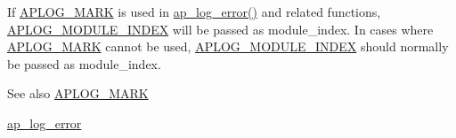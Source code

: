 If \hyperlink{group__APACHE__CORE__LOG_ga655e126996849bcb82e4e5a14c616f4a}{A\+P\+L\+O\+G\+\_\+\+M\+A\+RK} is used in \hyperlink{group__APACHE__CORE__LOG_ga5e6676c87418af7a1d323a116c78ecb4}{ap\+\_\+log\+\_\+error()} and related functions, \hyperlink{group__APACHE__CORE__LOG_gae75325996d1b2cf6120dded4cb153a22}{A\+P\+L\+O\+G\+\_\+\+M\+O\+D\+U\+L\+E\+\_\+\+I\+N\+D\+EX} will be passed as module\+\_\+index. In cases where \hyperlink{group__APACHE__CORE__LOG_ga655e126996849bcb82e4e5a14c616f4a}{A\+P\+L\+O\+G\+\_\+\+M\+A\+RK} cannot be used, \hyperlink{group__APACHE__CORE__LOG_gae75325996d1b2cf6120dded4cb153a22}{A\+P\+L\+O\+G\+\_\+\+M\+O\+D\+U\+L\+E\+\_\+\+I\+N\+D\+EX} should normally be passed as module\+\_\+index.

\begin{DoxySeeAlso}{See also}
\hyperlink{group__APACHE__CORE__LOG_ga655e126996849bcb82e4e5a14c616f4a}{A\+P\+L\+O\+G\+\_\+\+M\+A\+RK} 

\hyperlink{group__APACHE__CORE__LOG_ga5e6676c87418af7a1d323a116c78ecb4}{ap\+\_\+log\+\_\+error} 
\end{DoxySeeAlso}
